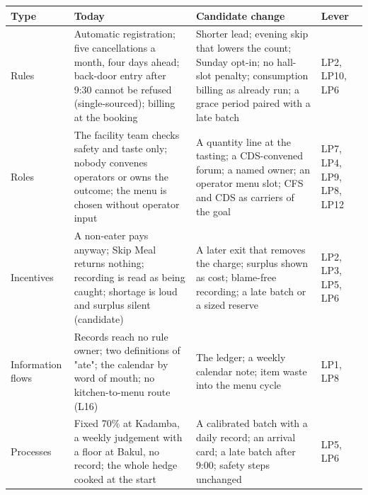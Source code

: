 \documentclass[
  10pt,
  table]{article}
\newcounter{none} %
\begin{document}
{\def\LTcaptype{none} %
\begin{longtable}[]{@{}
  >{\raggedright\arraybackslash}p{}
  >{\raggedright\arraybackslash}p{}
  >{\raggedright\arraybackslash}p{}
  >{\raggedright\arraybackslash}p{}@{}}
\toprule\noalign{}
\begin{minipage}[b]{\linewidth}\raggedright
\cellcolor{pblue}\color{white}\bfseries Type
\end{minipage} & \begin{minipage}[b]{\linewidth}\raggedright
\cellcolor{pblue}\color{white}\bfseries Today
\end{minipage} & \begin{minipage}[b]{\linewidth}\raggedright
\cellcolor{pblue}\color{white}\bfseries Candidate change
\end{minipage} & \begin{minipage}[b]{\linewidth}\raggedright
\cellcolor{pblue}\color{white}\bfseries Lever
\end{minipage} \\
\midrule\noalign{}
\endhead
\bottomrule\noalign{}
\endlastfoot
Rules & Automatic registration; five cancellations a month, four days ahead; back-door entry after 9:30 cannot be refused (single-sourced); billing at the booking & Shorter lead; evening skip that lowers the count; Sunday opt-in; no hall-slot penalty; consumption billing as already run; a grace period paired with a late batch & LP2, LP10, LP6 \\
Roles & The facility team checks safety and taste only; nobody convenes operators or owns the outcome; the menu is chosen without operator input & A quantity line at the tasting; a CDS-convened forum; a named owner; an operator menu slot; CFS and CDS as carriers of the goal & LP7, LP4, LP9, LP8, LP12 \\
Incentives & A non-eater pays anyway; Skip Meal returns nothing; recording is read as being caught; shortage is loud and surplus silent (candidate) & A later exit that removes the charge; surplus shown as cost; blame-free recording; a late batch or a sized reserve & LP2, LP3, LP5, LP6 \\
Information flows & Records reach no rule owner; two definitions of "ate"; the calendar by word of mouth; no kitchen-to-menu route (L16) & The ledger; a weekly calendar note; item waste into the menu cycle & LP1, LP8 \\
Processes & Fixed 70\% at Kadamba, a weekly judgement with a floor at Bakul, no record; the whole hedge cooked at the start & A calibrated batch with a daily record; an arrival card; a late batch after 9:00; safety steps unchanged & LP5, LP6 \\
\end{longtable}
}
\end{document}
